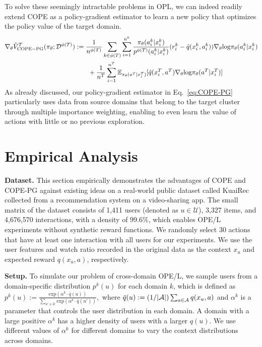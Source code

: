 \documentclass{article} %
\theoremstyle{definition}
\begin{document}
To solve these seemingly intractable problems in OPL, we can indeed readily extend COPE as a policy-gradient estimator to learn a new policy that optimizes the policy value of the target domain. 
\begin{align}
    \nabla_{\theta}\hat{V}^T_{\rm{COPE-PG}}(\pi_{\theta};\mathcal{D}^{\phi(T)})
    &:= \frac{1}{n^{\phi(T)}}\sum_{k \in \phi(T)}\sum_{i=1}^{n^{k}}\frac{\pi_{\theta}(a_{i}^{k}|x_{i}^{k})}{p^{\phi(T)}(a_{i}^{k}|x_{i}^{k})}(r_{i}^{k}-\hat{q}(x_{i}^{k},a_{i}^{k}))\nabla_{\theta}\mathrm{log}\pi_{\theta}(a_{i}^{k}|x_{i}^{k}) \notag \\
    & \qquad +\frac{1}{n^{T}}\sum_{i=1}^{n^{T}}\mathbb{E}_{\pi_{\theta}(a^T|x_{i}^{T})}[\hat{q}(x_{i}^{T},a^T)\nabla_{\theta}\mathrm{log}\pi_{\theta}(a^T|x_{i}^{T})] \label{eq:COPE-PG}
\end{align}
As already discussed, our policy-gradient estimator in Eq.~\eqref{eq:COPE-PG} particularly uses data from source domains that belong to the target cluster through multiple importance weighting, enabling to even learn the value of actions with little or no previous exploration.


\section{Empirical Analysis}
\label{others}

\textbf{Dataset.} This section empirically demonstrates the advantages of COPE and COPE-PG against existing ideas on a real-world public dataset called KuaiRec~\citep{gao2022kuairec} collected from a recommendation system on a video-sharing app.
The small matrix of the dataset consists of 1,411 users (denoted as $u \in \mathcal{U}$), 3,327 items, and 4,676,570 interactions, with a density of 99.6\%, which enables OPE/L experiments without synthetic reward functions. We randomly select 30 actions that have at least one interaction with all users for our experiments. We use the user features and watch ratio recorded in the original data as the context $x_u$ and expected reward $q(x_u,a)$, respectively. 

\textbf{Setup.} To simulate our problem of cross-domain OPE/L, we sample users from a domain-specific distribution $p^{k}(u)$ for each domain $k$, which is defined as $p^{k}(u) := \frac{\mathrm{exp}(\alpha^{k}\cdot \bar{q}(u))}{\sum_{u'\in \mathcal{U}}\mathrm{exp}(\alpha^{k}\cdot \bar{q}(u'))},$ where $\bar{q}(u) := (1/|\mathcal{A}|)\sum_{a\in \mathcal{A}}q(x_u,a)$ and $\alpha^{k}$ is a parameter that controls the user distribution in each domain. A domain with a large positive $\alpha^{k}$ has a higher density of users with a larger $q(u)$. We use different values of $\alpha^{k}$ for different domains to vary the context distributions across domains.
\end{document}
